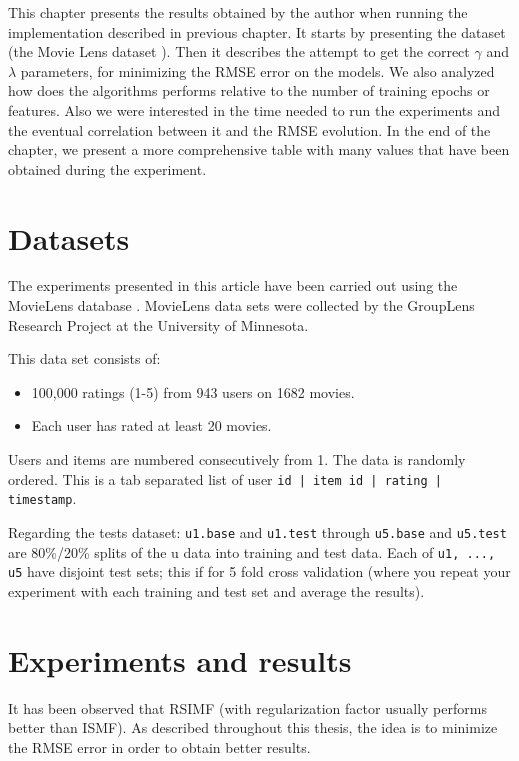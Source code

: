 \documentclass[10pt,a4paper]{article}  %
\begin{document}
This chapter presents the results obtained by the author when running the implementation described in previous chapter. It starts by presenting the dataset (the Movie Lens dataset \cite{MOVIELENS-DATA}). Then it describes the attempt to get the correct $\gamma$ and $\lambda$ parameters, for minimizing the RMSE error on the models. We also analyzed how does the algorithms performs relative to the number of training epochs or features. Also we were interested in the time needed to run the experiments and the eventual correlation between it and the RMSE evolution. In the end of the chapter, we present a more comprehensive table with many values that have been obtained during the experiment.

\section{Datasets}
\label{datasets}

The experiments presented in this article have been carried out using the MovieLens database \cite{MOVIELENS-DATA}. MovieLens data sets were collected by the GroupLens Research Project at the University of Minnesota.
 
This data set consists of:
\begin{itemize}
	\item 100,000 ratings (1-5) from 943 users on 1682 movies. 
	\item Each user has rated at least 20 movies. 
\end{itemize}

Users and items are numbered consecutively from 1. The data is randomly ordered. This is a tab separated list of user \texttt{id | item id | rating | timestamp}.

Regarding the tests dataset: \texttt{u1.base} and \texttt{u1.test} through \texttt{u5.base} and \texttt{u5.test} are 80\%/20\% splits of the u data into training and test data. Each of \texttt{u1, ..., u5} have disjoint test sets; this if for 5 fold cross validation (where you repeat your experiment with each training and test set and average the results).

\section{Experiments and results}

It has been observed that RSIMF (with regularization factor usually performs better than ISMF). As described throughout this thesis, the idea is to minimize the RMSE error in order to obtain better results. 
\end{document}
